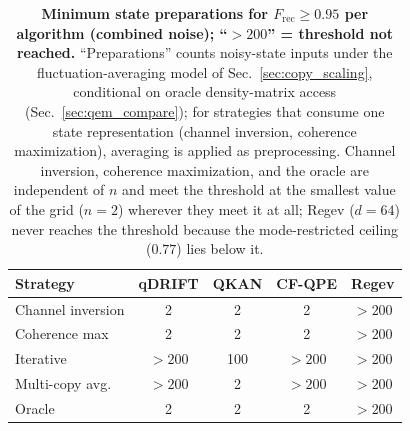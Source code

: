 \documentclass[pra,twocolumn,superscriptaddress,longbibliography,floatfix,nofootinbib]{revtex4-2}
\newcommand{\Frec}{F_\mathrm{rec}}
\begin{document}
\begin{table}[b]
\caption{\textbf{Minimum state preparations for $\Frec \geq 0.95$ per algorithm (combined noise); ``$>200$'' = threshold not reached.}
``Preparations'' counts noisy-state inputs under the fluctuation-averaging model of Sec.~\ref{sec:copy_scaling}, conditional on oracle density-matrix access (Sec.~\ref{sec:qem_compare}); for strategies that consume one state representation (channel inversion, coherence maximization), averaging is applied as preprocessing.
Channel inversion, coherence maximization, and the oracle are independent of $n$ and meet the threshold at the smallest value of the grid ($n = 2$) wherever they meet it at all; Regev ($d = 64$) never reaches the threshold because the mode-restricted ceiling ($0.77$) lies below it.}
\label{tab:min_copies}

\begin{tabular}{lcccc}
Strategy & qDRIFT & QKAN & CF-QPE & Regev \\
\hline
Channel inversion & 2 & 2 & 2 & $>200$ \\
Coherence max     & 2 & 2 & 2 & $>200$ \\
Iterative         & $>200$ & 100 & $>200$ & $>200$ \\
Multi-copy avg.   & $>200$ & 2 & $>200$ & $>200$ \\
Oracle            & 2 & 2 & 2 & $>200$ \\
\end{tabular}

\end{table}
\end{document}
